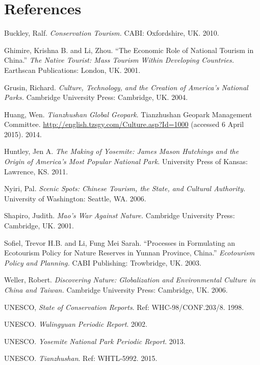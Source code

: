 \section*{References}

\bibent Buckley, Ralf. \textit{Conservation Tourism.} CABI: Oxfordshire, UK.
2010.

\bibent Ghimire, Krishna B. and Li, Zhou. ``The Economic Role of National
Tourism in China.'' \textit{The Native Tourist: Mass Tourism Within Developing
Countries.} Earthscan Publications: London, UK. 2001.

\bibent Grusin, Richard. \textit{Culture, Technology, and the Creation of
America's National Parks.} Cambridge University Press: Cambridge, UK. 2004.

\bibent Huang, Wen. \textit{Tianzhushan Global Geopark}. Tianzhushan Geopark
Management Committee. \url{http://english.tzsgy.com/Culture.asp?Id=1000}
(accessed 6 April 2015). 2014.

\bibent Huntley, Jen A. \textit{The Making of Yosemite: James Mason Hutchings
and the Origin of America's Most Popular National Park.} University Press of
Kansas: Lawrence, KS. 2011.

\bibent Nyiri, Pal. \textit{Scenic Spots: Chinese Tourism, the State, and
Cultural Authority.} University of Washington: Seattle, WA. 2006.

\bibent Shapiro, Judith. \textit{Mao's War Against Nature.} Cambridge University
Press: Cambridge, UK. 2001.

\bibent Sofiel, Trevor H.B. and Li, Fung Mei Sarah. ``Processes in Formulating
an Ecotourism Policy for Nature Reserves in Yunnan Province, China.''
\textit{Ecotourism Policy and Planning.} CABI Publishing: Trowbridge, UK. 2003.

\bibent Weller, Robert. \textit{Discovering Nature: Globalization and
Environmental Culture in China and Taiwan.} Cambridge University Press:
Cambridge, UK. 2006.

\bibent UNESCO, \textit{State of Conservation Reports}. Ref:
WHC-98/CONF.203/8. 1998.

\bibent UNESCO. \textit{Wulingyuan Periodic Report}. 2002.

\bibent UNESCO. \textit{Yosemite National Park Periodic Report}. 2013.

\bibent UNESCO. \textit{Tianzhushan}. Ref: WHTL-5992. 2015.
